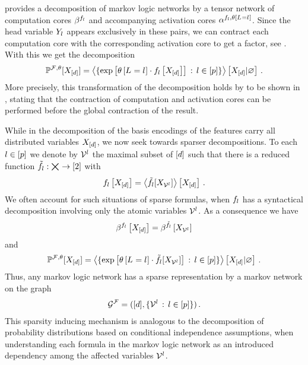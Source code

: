  provides a decomposition of markov logic networks by a tensor network of computation cores $\beta^{f_{l}}$ and accompanying activation cores $\alpha^{f_{l},\theta\left[L_{}=l_{}\right]}$.
Since the head variable $Y_{l}$ appears exclusively in these pairs, we can contract each computation core with the corresponding activation core to get a factor, see .
With this we get the decomposition
\begin{align*}
    \mathbb{P}^{\mathcal{F},\theta}[X_{[d]}]
    = \left\langle \{\mathrm{exp}\left[\theta\left[L_{}=l_{}\right]\cdot f_{l}\left[X_{[d]}\right]\right] \, : \, l\in[p]\}\right\rangle \left[ X_{[d]} | \varnothing \right] \, .
\end{align*}
More precisely, this transformation of the decomposition holds by  to be shown in , stating that the contraction of computation and activation cores can be performed before the global contraction of the result.

While in the decomposition of  the basis encodings of the features carry all distributed variables $X_{[d]}$, we now seek towards sparser decompositions.
To each $l\in[p]$ we denote by $\mathcal{V}^{l}$ the maximal subset of $[d]$ such that there is a reduced function
$\tilde{f}_{l} : \bigtimes_{} \rightarrow [2]$
with
\begin{align*}
    f_{l}\left[X_{[d]}\right]
    = \left\langle \tilde{f}_{l}[X_{\mathcal{V}^{l}}]\right\rangle \left[ X_{[d]} \right] \, .
\end{align*}
We often account for such situations of sparse formulas, when $f_{l}$ has a syntactical decomposition involving only the atomic variables $\mathcal{V}^{l}$.
As a consequence we have
\begin{align*}
    \beta^{f_{l}}\left[X_{[d]}\right]
    = \beta^{\tilde{f}_{l}}\left[X_{\mathcal{V}^{l}}\right]
\end{align*}
and
\begin{align*}
    \mathbb{P}^{\mathcal{F},\theta}[X_{[d]}]
    = \left\langle \{\mathrm{exp}\left[\theta\left[L_{}=l_{}\right]\cdot\tilde{f}_{l}[X_{\mathcal{V}^{l}}]\right] \, : \, l\in[p]\}\right\rangle \left[ X_{[d]} | \varnothing \right] \, .
\end{align*}
Thus, any markov logic network has a sparse representation by a markov network on the graph
\begin{align*}
    \mathcal{G}^{\mathcal{F}} = ([d],\{\mathcal{V}^{l} \, : \, l\in[p]\}) \, .
\end{align*}
This sparsity inducing mechanism is analogous to the decomposition of probability distributions based on conditional independence assumptions, when understanding each formula in the markov logic network as an introduced dependency among the affected variables $\mathcal{V}^{l}$.


